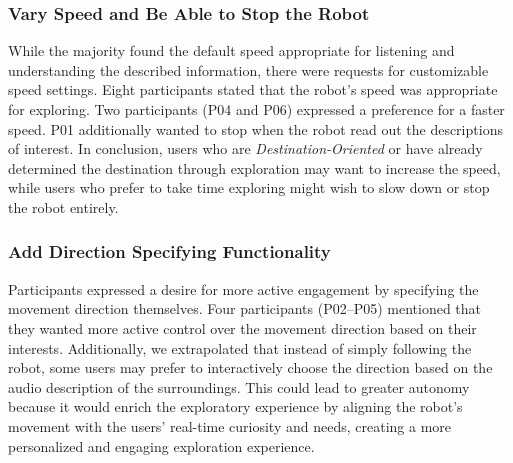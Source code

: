 \subsubsection{Vary Speed and Be Able to Stop the Robot}
\label{sec:implication_speed}
While the majority found the default speed appropriate for listening and understanding the described information, there were requests for customizable speed settings. 
Eight participants stated that the robot's speed was appropriate for exploring. 
Two participants (P04 and P06) expressed a preference for a faster speed.
P01 additionally wanted to stop when the robot read out the descriptions of interest.
In conclusion, users who are \textit{Destination-Oriented} or have already determined the destination through exploration may want to increase the speed, while users who prefer to take time exploring might wish to slow down or stop the robot entirely. 

\subsubsection{Add Direction Specifying Functionality}
\label{sec:implication_directionspecification}
Participants expressed a desire for more active engagement by specifying the movement direction themselves. 
Four participants (P02--P05) mentioned that they wanted more active control over the movement direction based on their interests.
Additionally, we extrapolated that instead of simply following the robot, some users may prefer to interactively choose the direction based on the audio description of the surroundings.
This could lead to greater autonomy because it would enrich the exploratory experience by aligning the robot's movement with the users' real-time curiosity and needs, creating a more personalized and engaging exploration experience.
